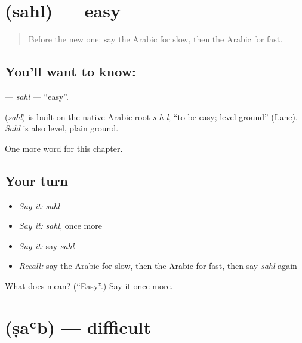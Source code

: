 \section[\texorpdfstring{\ar{سهل} (sahl)}{سهل (sahl)}]{ (sahl) — easy}

\label{lesson:AR-C83-sahl}



\begin{quote}
Before the new one: say the Arabic for slow, then the Arabic for fast.
\end{quote}

\subsection*{You'll want to know: }
\textbf{} — \emph{sahl} — \textquotedblleft{}easy\textquotedblright{}.

\begin{cousinweb}
\textbf{} (\emph{sahl}) is built on the native Arabic root \emph{s-h-l}, \textquotedblleft{}to be easy; level ground\textquotedblright{} (Lane). \emph{Sahl} is also level, plain ground.
\end{cousinweb}

\begin{grammarlens}[title={What you've built}]
One more word for this chapter.
\end{grammarlens}

\subsection*{Your turn}
\begin{itemize}
\raggedright
  \item \emph{Say it:} \emph{sahl}
  \item \emph{Say it:} \emph{sahl}, once more
  \item \emph{Say it:} say \emph{sahl}
  \item \emph{Recall:} say the Arabic for slow, then the Arabic for fast, then say \emph{sahl} again
\end{itemize}

\begin{tcolorbox}[breakable,colback=teal!4,colframe=teal!35!black,title={Before you move on}]
What does  mean? (\textquotedblleft{}Easy\textquotedblright{}.) Say it once more.
\end{tcolorbox}
\section[\texorpdfstring{\ar{صعب} (ṣaʿb)}{صعب (ṣaʿb)}]{ (ṣaʿb) — difficult}

